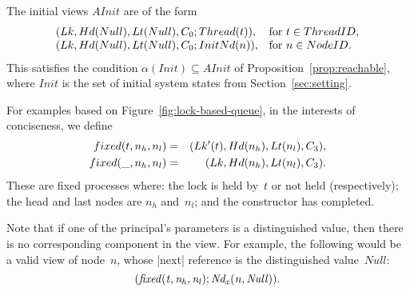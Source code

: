 The initial views $AInit$ are of the form
\[
\begin{array}{ll}
(Lk, Hd(Null), Lt(Null), C_0; Thread(t)), &
   \mbox{for $t \in ThreadID$}, \\
(Lk, Hd(Null), Lt(Null), C_0; InitNd(n)), & 
   \mbox{for $n \in NodeID$}.
\end{array}
\]
This satisfies the condition $\alpha(Init) \subseteq AInit$ of
Proposition~\ref{prop:reachable}, where $Init$ is the set of initial system
states from Section~\ref{sec:setting}.

For examples based on Figure~\ref{fig:lock-based-queue}, in the interests of
conciseness, we define
\begin{eqnarray*}
fixed(t, n_h, n_l) & = & (Lk'(t), Hd(n_h), Lt(n_l), C_3), \\
fixed(\_, n_h, n_l) & = & (Lk, Hd(n_h), Lt(n_l), C_3).
\end{eqnarray*}
%
These are fixed processes where: the lock is held by~$t$ or not held
(respectively); the head and last nodes are $n_h$ and~$n_l$; and the
constructor has completed.

Note that if one of the principal's parameters is a distinguished value, then
there is no corresponding component in the view.  For example, the following
would be a valid view of node~$n$, whose |next| reference is the distinguished
value~$Null$: 
\[ \it
(fixed(t, n_h, n_l);  Nd_x(n, Null)).
\]







